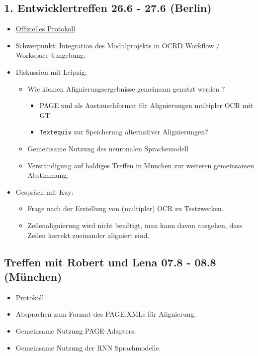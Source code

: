 \subsection {1. Entwicklertreffen 26.6 - 27.6 (Berlin)}
\begin{itemize}
  \item \href{https://wiki.de.dariah.eu/display/OCR/1.+Entwickler-Workshop}{Offizielles Protokoll}
  \item Schwerpunkt: Integration des Modulprojekts in OCRD Workflow / Workspace-Umgebung.
  \item Diskussion mit Leipzig:  
  \begin{itemize}
    \item Wie können Alignierungsergebnisse gemeinsam genutzt werden ?
      \begin{itemize}
    \item PAGE.xml als Austauschformat für Alignierungen multipler OCR mit GT.
    \item \texttt{Textequiv} zur Speicherung alternativer Alignierungen?
    \end{itemize}
	\item Gemeinsame Nutzung des neuronalen Sprachemodell
    \item Verständigung auf baldiges Treffen in München zur weiteren gemeinsamen Abstimmung.
  \end{itemize}
  \item Gespräch mit Kay:
  \begin{itemize}
    \item Frage nach der Erstellung von (multipler) OCR zu Testzwecken.
    \item Zeilenalignierung wird nicht benötigt, man kann davon ausgehen, dass Zeilen korrekt
    zueinander aligniert sind.
  \end{itemize}
  
\end{itemize}

\subsection {Treffen mit Robert und Lena 07.8 - 08.8 (München)}
\begin{itemize}
\item \href{https://git.informatik.uni-leipzig.de/ls36hiqo/ocr-d/wikis/planung#7-8-august-2018-am-cis-in-m%C3%BCnchen-mit-florian-und-tobias}{Protokoll}

\item Absprachen zum Format des PAGE.XMLs für Alignierung.
\item Gemeinsame Nutzung PAGE-Adapters.
\item Gemeinsame Nutzung der RNN Sprachmodelle.
\end{itemize}
